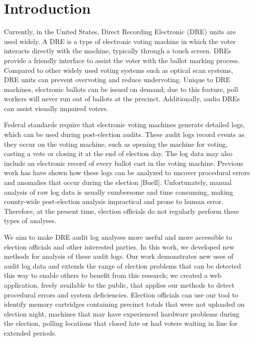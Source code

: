 \section{Introduction}

Currently, in the United States, Direct Recording Electronic (DRE) units are used widely. A DRE is a type of electronic voting machine in which the voter interacts directly with the machine, typically through a touch screen. DREs provide a friendly interface to assist the voter with the ballot marking process. Compared to other widely used voting systems such as optical scan systems, DRE units can prevent overvoting and reduce undervoting. Unique to DRE machines, electronic ballots can be issued on demand; due to this feature, poll workers will never run out of ballots at the precinct.  Additionally, audio DREs can assist visually impaired voters.
 
Federal standards require that electronic voting machines generate detailed logs, which can be used during post-election audits. These audit logs record events as they occur on the voting machine, such as opening the machine for voting, casting a vote or closing it at the end of election day. The log data may also include an electronic record of every ballot cast in the voting machine.  Previous work has have shown how these logs can be analyzed to uncover procedural errors and anomalies that occur during the election [Buell].  Unfortunately, manual analysis of raw log data is usually cumbersome and time consuming, making county-wide post-election analysis impractical and prone to human error. Therefore, at the present time, election officials do not regularly perform these types of analyses. 

We aim to make DRE audit log analyses more useful and more accessible to election officials and other interested parties. In this work, we developed new methods for analysis of these audit logs. Our work demonstrates new uses of audit log data and extends the range of election problems that can be detected this way to enable others to benefit from this research; we created a web application, freely available to the public, that applies our methods to detect procedural errors and system deficiencies.  Election officials can use our tool to identify memory cartridges containing precinct totals that were not uploaded on election night, machines that may have experienced hardware problems during the election, polling locations that closed late or had voters waiting in line for extended periods.
 
